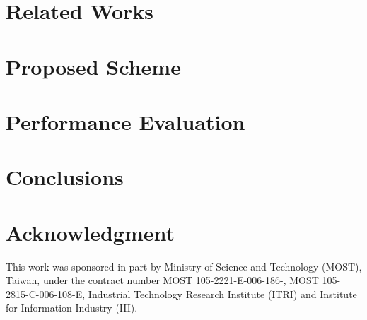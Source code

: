 \documentclass[10pt, conference, compsocconf]{IEEEtran}
\begin{document}
\section{Related Works} \label{ch:2-background}
	

\section{Proposed Scheme} \label{ch:3-proposed}
	
	
\section{Performance Evaluation} \label{ch:5-performance}
	
	
\section{Conclusions} \label{ch:6-conclusion}
	

\section*{Acknowledgment}
This work was sponsored in part by Ministry of Science and Technology (MOST), Taiwan, under the contract number MOST 105-2221-E-006-186-, MOST 105-2815-C-006-108-E, Industrial Technology Research Institute (ITRI) and Institute for Information Industry (III).


	
	
\end{document}
